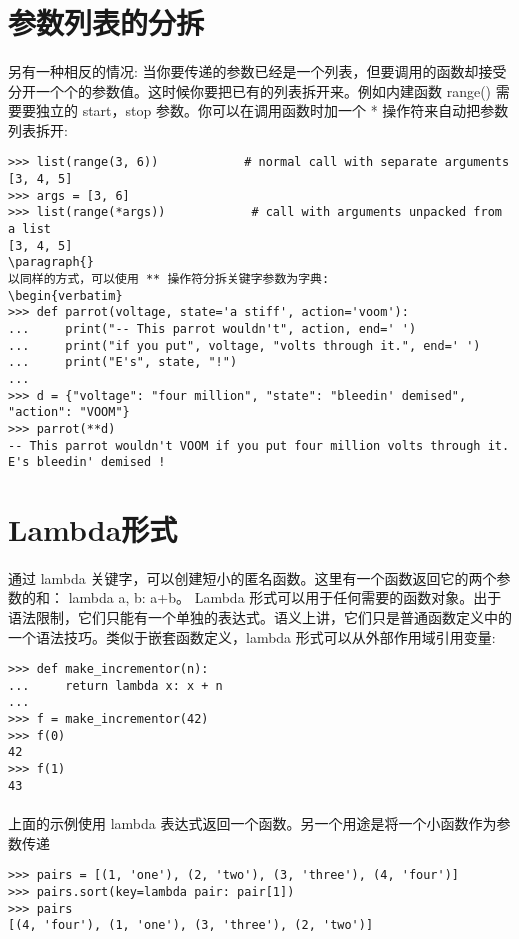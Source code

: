 \documentclass{article}
\begin{document}
\begin{CJK}{UTF8}{gbsn}
\section{参数列表的分拆}
\paragraph{}
另有一种相反的情况: 当你要传递的参数已经是一个列表，但要调用的函数却接受分开一个个的参数值。这时候你要把已有的列表拆开来。例如内建函数 range() 需要要独立的 start，stop 参数。你可以在调用函数时加一个 * 操作符来自动把参数列表拆开:
\begin{verbatim}
>>> list(range(3, 6))            # normal call with separate arguments
[3, 4, 5]
>>> args = [3, 6]
>>> list(range(*args))            # call with arguments unpacked from a list
[3, 4, 5]
\paragraph{}
以同样的方式，可以使用 ** 操作符分拆关键字参数为字典:
\begin{verbatim}
>>> def parrot(voltage, state='a stiff', action='voom'):
...     print("-- This parrot wouldn't", action, end=' ')
...     print("if you put", voltage, "volts through it.", end=' ')
...     print("E's", state, "!")
...
>>> d = {"voltage": "four million", "state": "bleedin' demised", "action": "VOOM"}
>>> parrot(**d)
-- This parrot wouldn't VOOM if you put four million volts through it. E's bleedin' demised !
\end{verbatim}
\section{Lambda形式}
\paragraph{}
通过 lambda 关键字，可以创建短小的匿名函数。这里有一个函数返回它的两个参数的和： lambda a, b: a+b。 Lambda 形式可以用于任何需要的函数对象。出于语法限制，它们只能有一个单独的表达式。语义上讲，它们只是普通函数定义中的一个语法技巧。类似于嵌套函数定义，lambda 形式可以从外部作用域引用变量:
\begin{verbatim}
>>> def make_incrementor(n):
...     return lambda x: x + n
...
>>> f = make_incrementor(42)
>>> f(0)
42
>>> f(1)
43
\end{verbatim}
\paragraph{}
上面的示例使用 lambda 表达式返回一个函数。另一个用途是将一个小函数作为参数传递
\begin{verbatim}
>>> pairs = [(1, 'one'), (2, 'two'), (3, 'three'), (4, 'four')]
>>> pairs.sort(key=lambda pair: pair[1])
>>> pairs
[(4, 'four'), (1, 'one'), (3, 'three'), (2, 'two')]
\end{verbatim}

\end{CJK}
\end{document}
